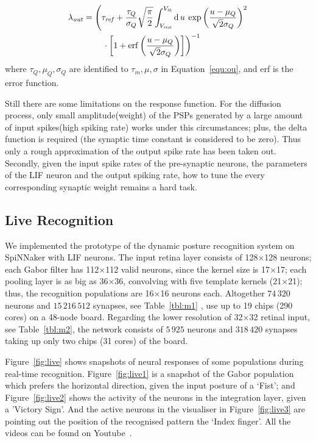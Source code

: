 \documentclass[journal]{journal}
\def\D{\mathrm{d}}
\begin{document}
\begin{align}
\lambda_\mathit{out} &=\left(\tau_\mathit{ref} + \frac{\tau_Q}{\sigma_Q}\sqrt{\frac{\pi}{2}} \int_{V_\mathit{rest}}^{V_\mathit{th}}\D\,u \:\exp \left(\frac{u-\mu_Q}{\sqrt2\sigma_Q} \right )^{2} \right. \nonumber \\
&\qquad \left. \vphantom{\int_t} \cdot  \left[1+\mathrm{erf} \left(\frac{u-\mu_Q}{\sqrt2\sigma_Q} \right ) \right ]\right)^{-1}
\label{equ:sgt}
\end{align}
where $\tau_Q, \mu_Q, \sigma_Q$ are identified to $\tau_m, \mu, \sigma$ in Equation~\ref{equ:ou}, and erf is the error function.

Still there are some limitations on the response function. 
For the diffusion process, only small amplitude(weight) of the PSPs generated by a large amount of input spikes(high spiking rate) works under this circumstances; 
plus, the delta function is required (the synaptic time constant is considered to be zero). Thus only a rough approximation of the output spike rate has been taken out.
Secondly, given the input spike rates of the pre-synaptic neurons, the parameters of the LIF neuron and the output spiking rate, how to tune the every corresponding synaptic weight remains a hard task.


\subsection{Live Recognition}
We implemented the prototype of the dynamic posture recognition system on SpiNNaker with LIF neurons. 
The input retina layer consists of 128$\times$128 neurons; 
each Gabor filter has 112$\times$112 valid neurons, since the kernel size is 17$\times$17; 
each pooling layer is as big as 36$\times$36, convolving with five template kernels (21$\times$21); 
thus, the recognition populations are 16$\times$16 neurons each. Altogether $74\,320$ neurons and $15\,216\,512$ synapses, see Table~\ref{tbl:m1} , use up to 19 chips (290 cores) on a 48-node board. Regarding the lower resolution of 32$\times$32 retinal input, see Table~\ref{tbl:m2}, the network consists of $5\,925$ neurons and $318\,420$ synapses taking up only two chips (31 cores) of the board.

Figure~\ref{fig:live} shows snapshots of neural responses of some populations during real-time recognition.
Figure~\ref{fig:live1} is a snapshot of the Gabor population which prefers the horizontal direction, given the input posture of a `Fist'; and Figure~\ref{fig:live2} shows the activity of the neurons in the integration layer, given a 'Victory Sign'.
And the active neurons in the visualiser in Figure~\ref{fig:live3} are pointing out the position of the recognised pattern the `Index finger'. 
All the videos can be found on Youtube~\cite{video1, video2, video3}. %
\end{document}
